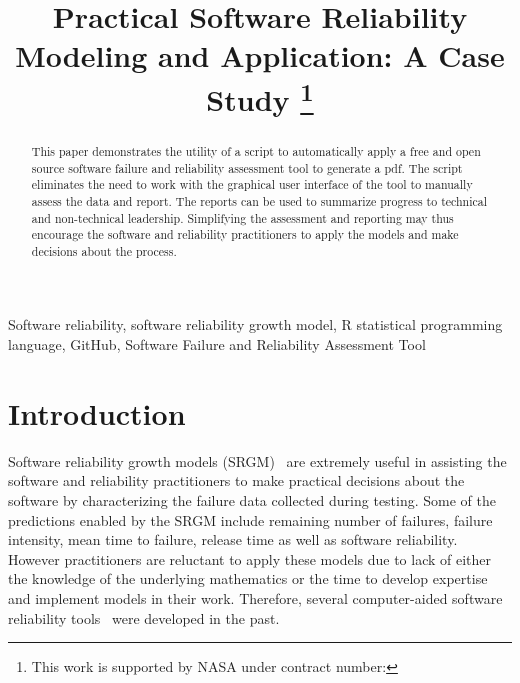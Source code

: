 \documentclass[journal]{IEEEtran}
\begin{document}
\title{Practical Software Reliability Modeling and Application: A Case Study
\thanks{This work is supported by NASA under contract number: }
}

\author{%
\and
{}
}

\maketitle

\begin{abstract}
This paper demonstrates the utility of a script to automatically apply a free and open source software failure and reliability assessment tool to generate a pdf. The script eliminates the need to work with the graphical user interface of the tool to manually assess the data and report. The reports can be used to summarize progress to technical and non-technical leadership. Simplifying the assessment and reporting may thus encourage the software and reliability practitioners to apply the models and make decisions about the process.
\end{abstract}

\begin{IEEEkeywords}
Software reliability, software reliability growth model, R statistical programming language, GitHub, Software Failure and Reliability Assessment Tool
\end{IEEEkeywords}


\section{Introduction}\label{sec:Intro}
Software reliability growth models (SRGM)~\cite{BookHoSRE} are extremely useful in assisting the software and reliability practitioners to make practical decisions about the software by characterizing the failure data collected during testing. Some of the predictions enabled by the SRGM include remaining number of failures, failure intensity, mean time to failure, release time as well as software reliability. However practitioners are reluctant to apply these models due to lack of either the knowledge of the underlying mathematics or the time to develop expertise and implement models in their work. Therefore, several computer-aided software reliability tools~\cite{trSMERFS,inProcISSRE2013_100,lyu1992casre} were developed in the past.
\end{document}
